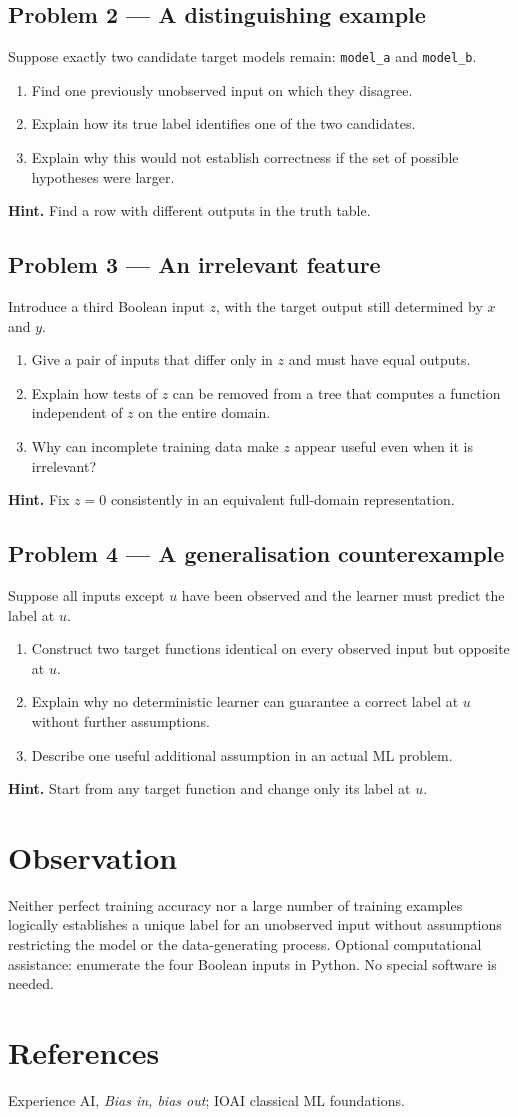 \documentclass[11pt,a4paper]{article}
\newcommand{\problem}[1]{\subsection*{Problem #1}}
\begin{document}
\problem{2 --- A distinguishing example}
Suppose exactly two candidate target models remain: \texttt{model\_a} and \texttt{model\_b}.
\begin{enumerate}[label=(\alph*)]
\item Find one previously unobserved input on which they disagree.
\item Explain how its true label identifies one of the two candidates.
\item Explain why this would not establish correctness if the set of possible hypotheses were larger.
\end{enumerate}
\textbf{Hint.} Find a row with different outputs in the truth table.

\problem{3 --- An irrelevant feature}
Introduce a third Boolean input $z$, with the target output still determined by $x$ and $y$.
\begin{enumerate}[label=(\alph*)]
\item Give a pair of inputs that differ only in $z$ and must have equal outputs.
\item Explain how tests of $z$ can be removed from a tree that computes a function independent of $z$ on the entire domain.
\item Why can incomplete training data make $z$ appear useful even when it is irrelevant?
\end{enumerate}
\textbf{Hint.} Fix $z=0$ consistently in an equivalent full-domain representation.

\problem{4 --- A generalisation counterexample}
Suppose all inputs except $u$ have been observed and the learner must predict the label at $u$.
\begin{enumerate}[label=(\alph*)]
\item Construct two target functions identical on every observed input but opposite at $u$.
\item Explain why no deterministic learner can guarantee a correct label at $u$ without further assumptions.
\item Describe one useful additional assumption in an actual ML problem.
\end{enumerate}
\textbf{Hint.} Start from any target function and change only its label at $u$.

\section*{Observation}
Neither perfect training accuracy nor a large number of training examples logically establishes a unique label for an unobserved input without assumptions restricting the model or the data-generating process. Optional computational assistance: enumerate the four Boolean inputs in Python. No special software is needed.

\section*{References}
Experience AI, \emph{Bias in, bias out}; IOAI classical ML foundations.
\end{document}
